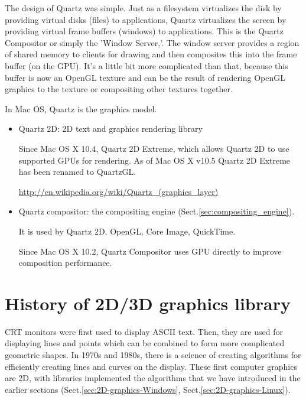 The design of Quartz was simple.
Just as a filesystem virtualizes the disk by providing virtual disks (files) to
applications, Quartz virtualizes the screen by providing virtual frame buffers
(windows) to applications. This is the Quartz Compositor or simply the 'Window
Server,'. The window server provides a region of shared memory to clients for
drawing and then composites this into the frame buffer (on the GPU).
It's a little bit more complicated than that, because this buffer is now an
OpenGL texture and can be the result of rendering OpenGL graphics to the texture
or compositing other textures together.


In Mac OS, Quartz is the graphics model.
\begin{itemize}
  \item Quartz 2D: 2D text and graphics rendering library

Since Mac OS X 10.4, Quartz 2D Extreme, which allows Quartz 2D to use supported GPUs for rendering.
As of Mac OS X v10.5 Quartz 2D Extreme has been renamed to QuartzGL.

\url{http://en.wikipedia.org/wiki/Quartz_(graphics_layer)}
  
  \item Quartz compositor: the compositing engine
  (Sect.\ref{sec:compositing_engine}). 
  
  It is used by Quartz 2D, OpenGL, Core Image, QuickTime.
  
  Since Mac OS X 10.2, Quartz Compositor uses GPU directly to improve composition performance.
    
\end{itemize}

% 




\section{History of 2D/3D graphics library}
\label{sec:3D_graphics-library}

CRT monitors were first used to display ASCII text. Then, they are
used for displaying lines and points which can be combined to form
more complicated geometric shapes. In 1970s and 1980s, there is a
science of creating algorithms for efficiently creating lines and
curves on the display. These first computer graphics are 2D, with libraries
implemented the algorithms that we have introduced in the earlier sections
(Sect.\ref{sec:2D-graphics-Windows}, Sect.\ref{sec:2D-graphics-Linux}).

